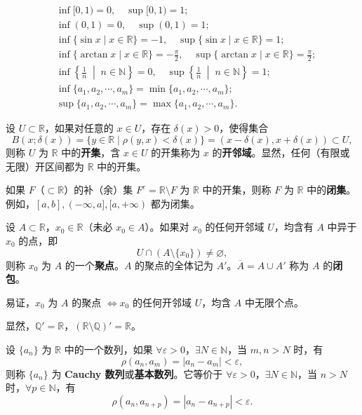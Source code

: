 \begin{example}\label{ex:1.3.1}
\begin{align*}
&\inf[0,1) = 0,\quad \sup[0,1) = 1; \\
&\inf(0,1) = 0,\quad \sup(0,1) = 1; \\
&\inf\{\sin x \mid x \in \mathbb{R}\} = -1,\quad \sup\{\sin x \mid x \in \mathbb{R}\} = 1; \\
&\inf\{\operatorname{arctan} x \mid x \in \mathbb{R}\} = -\frac{\pi}{2},\quad \sup\{\operatorname{arctan} x \mid x \in \mathbb{R}\} = \frac{\pi}{2}; \\
&\inf\left\{\frac{1}{n}\;\middle|\; n \in \mathbb{N}\right\} = 0,\quad \sup\left\{\frac{1}{n}\;\middle|\; n \in \mathbb{N}\right\} = 1; \\
&\inf\{a_1, a_2, \cdots, a_m\} = \min\{a_1, a_2, \cdots, a_m\}; \\
&\sup\{a_1, a_2, \cdots, a_m\} = \max\{a_1, a_2, \cdots, a_m\}.
\end{align*}
\end{example}

\begin{definition}\label{def:1.3.4}
设 $U \subset \mathbb{R}$，如果对任意的 $x \in U$，存在 $\delta(x) > 0$，使得集合
\[
B(x;\delta(x)) = \{y \in \mathbb{R} \mid \rho(y, x) < \delta(x)\} = (x - \delta(x), x + \delta(x)) \subset U,
\]
则称 $U$ 为 $\mathbb{R}$ 中的\textbf{开集}，含 $x \in U$ 的开集称为 $x$ 的\textbf{开邻域}。显然，任何（有限或无限）开区间都为 $\mathbb{R}$ 中的开集。

如果 $F$（$\subset \mathbb{R}$）的补（余）集 $F^c = \mathbb{R} \setminus F$ 为 $\mathbb{R}$ 中的开集，则称 $F$ 为 $\mathbb{R}$ 中的\textbf{闭集}。例如，$[a,b], (-\infty, a], [a, +\infty)$ 都为闭集。
\end{definition}

\begin{definition}\label{def:1.3.5}
设 $A \subset \mathbb{R}$，$x_0 \in \mathbb{R}$（未必 $x_0 \in A$）。如果对 $x_0$ 的任何开邻域 $U$，均含有 $A$ 中异于 $x_0$ 的点，即
\[
U \cap (A \setminus \{x_0\}) \neq \varnothing,
\]
则称 $x_0$ 为 $A$ 的一个\textbf{聚点}。$A$ 的聚点的全体记为 $A'$。$\overline{A} = A \cup A'$ 称为 $A$ 的\textbf{闭包}。

易证，$x_0$ 为 $A$ 的聚点 $\iff x_0$ 的任何开邻域 $U$，均含 $A$ 中无限个点。

显然，$\mathbb{Q}' = \mathbb{R}$，$(\mathbb{R} \setminus \mathbb{Q})' = \mathbb{R}$。
\end{definition}

\begin{definition}\label{def:1.3.6}
设 $\{a_n\}$ 为 $\mathbb{R}$ 中的一个数列，如果 $\forall \varepsilon > 0$，$\exists N \in \mathbb{N}$，当 $m, n > N$ 时，有
\[
\rho(a_n, a_m) = |a_n - a_m| < \varepsilon,
\]
则称 $\{a_n\}$ 为 \textbf{Cauchy 数列}或\textbf{基本数列}。它等价于 $\forall \varepsilon > 0$，$\exists N \in \mathbb{N}$，当 $n > N$ 时，$\forall p \in \mathbb{N}$，有
\[
\rho(a_n, a_{n+p}) = |a_n - a_{n+p}| < \varepsilon.
\]
\end{definition}

